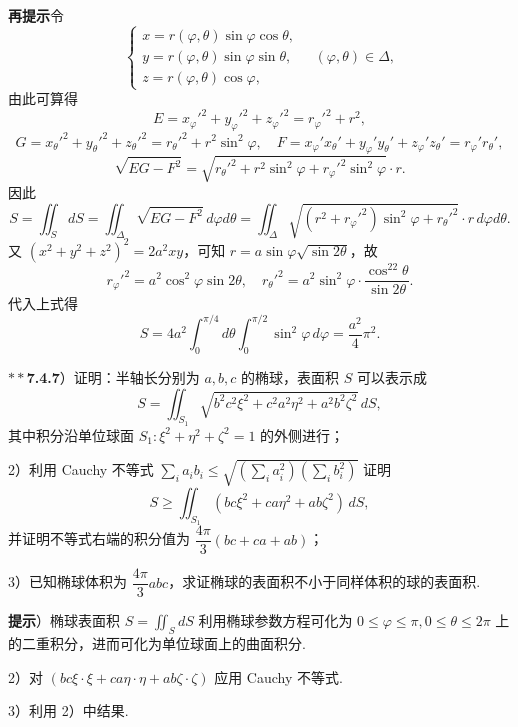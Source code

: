 \documentclass[UTF8,12pt,a4paper,fontset=fandol]{ctexart}
\begin{document}
\noindent\textbf{再提示}\quad 令
\[
\begin{cases}
x=r(\varphi,\theta)\sin\varphi\cos\theta,\\
y=r(\varphi,\theta)\sin\varphi\sin\theta,\\
z=r(\varphi,\theta)\cos\varphi,
\end{cases}
\quad(\varphi,\theta)\in\Delta,
\]
由此可算得
\[
E=x_\varphi'^2+y_\varphi'^2+z_\varphi'^2=r_\varphi'^2+r^2,
\]
\[
G=x_\theta'^2+y_\theta'^2+z_\theta'^2=r_\theta'^2+r^2\sin^2\varphi,\quad
F=x_\varphi'x_\theta'+y_\varphi'y_\theta'+z_\varphi'z_\theta'=r_\varphi'r_\theta',
\]
\[
\sqrt{EG-F^2}
=\sqrt{r_\theta'^2+r^2\sin^2\varphi+r_\varphi'^2\sin^2\varphi}\cdot r.
\]
因此
\[
S=\iint_SdS=\iint_\Delta\sqrt{EG-F^2}\,d\varphi d\theta
=\iint_\Delta\sqrt{(r^2+r_\varphi'^2)\sin^2\varphi+r_\theta'^2}\cdot r\,d\varphi d\theta.
\]
又 $(x^2+y^2+z^2)^2=2a^2xy$，可知 $r=a\sin\varphi\sqrt{\sin2\theta}$，故
\[
r_\varphi'^2=a^2\cos^2\varphi\sin2\theta,\quad
r_\theta'^2=a^2\sin^2\varphi\cdot\frac{\cos^22\theta}{\sin2\theta}.
\]
代入上式得
\[
S=4a^2\int_0^{\pi/4}d\theta\int_0^{\pi/2}\sin^2\varphi\,d\varphi
=\frac{a^2}{4}\pi^2.
\]

\noindent\textbf{$**$7.4.7}）证明：半轴长分别为 $a,b,c$ 的椭球，表面积 $S$ 可以表示成
\[
S=\iint_{S_1}\sqrt{b^2c^2\xi^2+c^2a^2\eta^2+a^2b^2\zeta^2}\,dS, \tag{1}
\]
其中积分沿单位球面 $S_1:\xi^2+\eta^2+\zeta^2=1$ 的外侧进行；

2）利用 Cauchy 不等式 $\sum_i a_ib_i\le\sqrt{\left(\sum_i a_i^2\right)\left(\sum_i b_i^2\right)}$ 证明
\[
S\ge\iint_{S_1}(bc\xi^2+ca\eta^2+ab\zeta^2)\,dS,
\]
并证明不等式右端的积分值为 $\dfrac{4\pi}{3}(bc+ca+ab)$；

3）已知椭球体积为 $\dfrac{4\pi}{3}abc$，求证椭球的表面积不小于同样体积的球的表面积.

\noindent\textbf{提示}）椭球表面积 $S=\iint_SdS$ 利用椭球参数方程可化为 $0\le\varphi\le\pi,0\le\theta\le2\pi$ 上的二重积分，进而可化为单位球面上的曲面积分.

2）对 $(bc\xi\cdot\xi+ca\eta\cdot\eta+ab\zeta\cdot\zeta)$ 应用 Cauchy 不等式.

3）利用 2）中结果.
\end{document}
